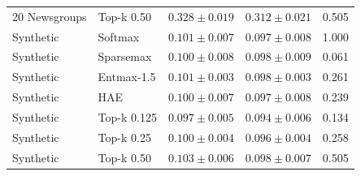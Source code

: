 \begin{table}[!t]
\begin{tabular}{@{}llccc@{}}
20 Newsgroups & Top-k 0.50 & $0.328 \pm 0.019$ & $0.312 \pm 0.021$ & 0.505 \\
\addlinespace
Synthetic & Softmax & $0.101 \pm 0.007$ & $0.097 \pm 0.008$ & 1.000 \\
Synthetic & Sparsemax & $0.100 \pm 0.008$ & $0.098 \pm 0.009$ & 0.061 \\
Synthetic & Entmax-1.5 & $0.101 \pm 0.003$ & $0.098 \pm 0.003$ & 0.261 \\
Synthetic & HAE & $0.100 \pm 0.007$ & $0.097 \pm 0.008$ & 0.239 \\
Synthetic & Top-k 0.125 & $0.097 \pm 0.005$ & $0.094 \pm 0.006$ & 0.134 \\
Synthetic & Top-k 0.25 & $0.100 \pm 0.004$ & $0.096 \pm 0.004$ & 0.258 \\
Synthetic & Top-k 0.50 & $0.103 \pm 0.006$ & $0.098 \pm 0.007$ & 0.505 \\
\bottomrule
\end{tabular}
\end{table}
